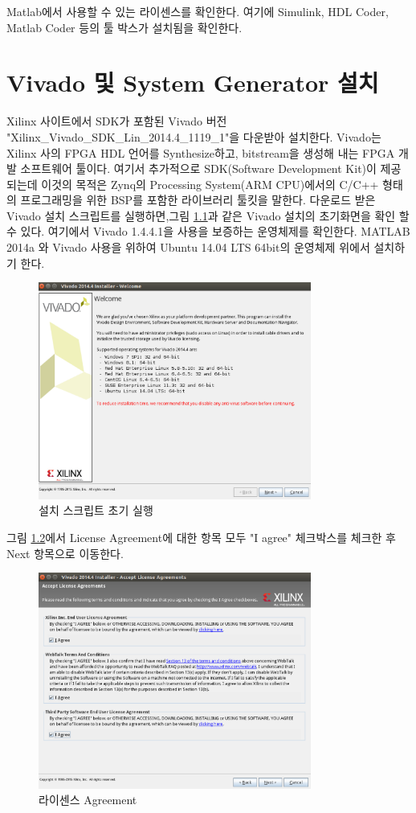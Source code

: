 \documentclass[11pt
  , a4paper
  , article
  , oneside
]{memoir}
\begin{document}
Matlab에서 사용할 수 있는 라이센스를 확인한다.  여기에 Simulink, HDL Coder, Matlab Coder 등의 툴 박스가 설치됨을 확인한다.

\clearpage

\chapter{Vivado 및 System Generator 설치}
Xilinx 사이트에서 SDK가 포함된 Vivado 버전 "Xilinx\_Vivado\_SDK\_Lin\_2014.4\_1119\_1"을 다운받아 설치한다. Vivado는 Xilinx 사의 FPGA HDL 언어를 Synthesize하고, bitstream을 생성해 내는 FPGA 개발 소프트웨어 툴이다. 여기서 추가적으로 SDK(Software Development Kit)이 제공 되는데 이것의 목적은 Zynq의 Processing System(ARM CPU)에서의 C/C++ 형태의 프로그래밍을 위한 BSP를 포함한 라이브러리 툴킷을 말한다. 다운로드 받은 Vivado 설치 스크립트를 실행하면,그림 \ref{fig:viva_install_1}과 같은 Vivado 설치의 초기화면을 확인 할 수 있다. 여기에서 Vivado 1.4.4.1을 사용을 보증하는 운영체제를 확인한다. MATLAB 2014a 와 Vivado 사용을 위하여 Ubuntu 14.04 LTS 64bit의 운영체제 위에서 설치하기 한다. 

\begin{figure}[h!]
	\centering
	\includegraphics[width=0.8\textwidth, height=0.4\textwidth]{./images/vivado-1.eps}
	\caption{설치 스크립트 초기 실행}
	\label{fig:viva_install_1} 
\end{figure}	

그림 \ref{fig:viva_install_2}에서 License Agreement에 대한 항목 모두 "I agree" 체크박스를 체크한 후 Next 항목으로 이동한다.
\begin{figure}[h!]
	\centering
	\includegraphics[width=0.8\textwidth, height=0.37\textwidth]{./images/vivado-2.eps}
	\caption{라이센스 Agreement}
	\label{fig:viva_install_2} 
\end{figure}	
\end{document}
